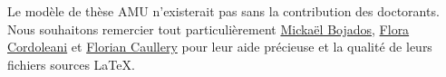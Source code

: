 Le modèle de thèse AMU n'existerait pas sans la contribution des doctorants. Nous souhaitons remercier tout particulièrement \href{http://www.theses.fr/2011AIX20720}{Mickaël Bojados}, \href{http://www.theses.fr/2011AIX22111}{Flora Cordoleani} et \href{http://www.theses.fr/2014AIXM4013}{Florian Caullery} pour leur aide précieuse et la qualité de leurs fichiers sources LaTeX.

\lipsum[1-2]
